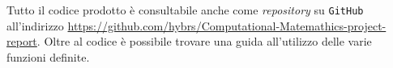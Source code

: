 Tutto il codice prodotto è consultabile anche come \textit{repository} su \texttt{GitHub} all'indirizzo \url{https://github.com/hybrs/Computational-Matemathics-project-report}.
Oltre al codice è possibile trovare una guida all'utilizzo delle varie funzioni definite.
\newpage
